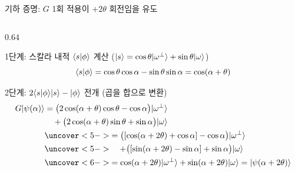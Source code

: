 \documentclass[aspectratio=169, 10pt]{beamer}
\begin{document}
\begin{frame}{기하 증명: $G$ 1회 적용이 $+2\theta$ 회전임을 유도}
\begin{columns}[c]
\begin{column}{0.64\textwidth}
{            \vspace{-0.15cm}}
            \pause
            \begin{qcblock}{1단계: 스칼라 내적 $\langle s|\phi\rangle$ 계산 ($|s\rangle = \cos\theta|\omega^\perp\rangle + \sin\theta|\omega\rangle$)}
                {\small\vspace{-0.15cm}
                $$\langle s|\phi\rangle = \cos\theta\cos\alpha - \sin\theta\sin\alpha = \cos(\alpha + \theta)$$
                \vspace{-0.18cm}}
            \end{qcblock}
            \pause
            \begin{qcblock}{2단계: $2\langle s|\phi\rangle|s\rangle - |\phi\rangle$ 전개 (곱을 합으로 변환)}
                {\footnotesize\vspace{-0.22cm}
                \begin{align*}
                    G\ket{\psi(\alpha)} &= \big(2\cos(\alpha+\theta)\cos\theta - \cos\alpha\big)\ket{\omega^\perp} \\
                    &\quad + \big(2\cos(\alpha+\theta)\sin\theta + \sin\alpha\big)\ket{\omega} \\
                    &\uncover<5->{= \big([\cos(\alpha+2\theta)+\cos\alpha] - \cos\alpha\big)\ket{\omega^\perp}} \\
                    &\uncover<5->{\quad + \big([\sin(\alpha+2\theta)-\sin\alpha] + \sin\alpha\big)\ket{\omega}} \\
                    &\uncover<6->{= \cos(\alpha+2\theta)\ket{\omega^\perp} + \sin(\alpha+2\theta)\ket{\omega} = \ket{\psi(\alpha+2\theta)}}
                \end{align*}
                \vspace{-0.22cm}}
            \end{qcblock}
        \end{column}
    \end{columns}
\end{frame}
\end{document}
